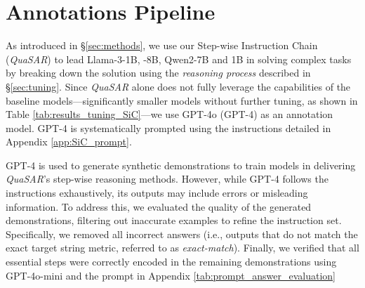 \documentclass[11pt]{article}
\newcommand{\QuaSAR}{\emph{QuaSAR}\xspace}
\begin{document}
\begin{table}[]
\section{Annotations Pipeline}
\label{app:annotation}
As introduced in \S \ref{sec:methods}, we use our Step-wise Instruction Chain (\QuaSAR) to lead Llama-3-1B, -8B, Qwen2-7B and 1B in solving complex tasks by breaking down the solution using the \textit{reasoning process} described in \S \ref{sec:tuning}. Since \QuaSAR alone does not fully leverage the capabilities of the baseline models—significantly smaller models without further tuning, as shown in Table \ref{tab:results_tuning_SiC}—we use GPT-4o (GPT-4) as an annotation model. GPT-4 is systematically prompted using the instructions detailed in Appendix \ref{app:SiC_prompt}.

GPT-4 is used to generate synthetic demonstrations to train models in delivering \QuaSAR's step-wise reasoning methods. However, while GPT-4 follows the instructions exhaustively, its outputs may include errors or misleading information. To address this, we evaluated the quality of the generated demonstrations, filtering out inaccurate examples to refine the instruction set. Specifically, we removed all incorrect answers (i.e., outputs that do not match the exact target string metric, referred to as \textit{exact-match}). Finally, we verified that all essential steps were correctly encoded in the remaining demonstrations using GPT-4o-mini and the prompt in Appendix \ref{tab:prompt_answer_evaluation}
\end{table}
\end{document}
